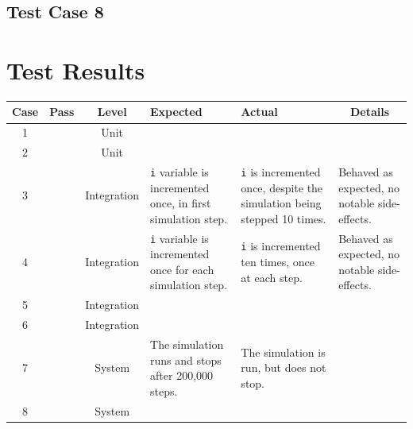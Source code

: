 \documentclass[11pt]{article}
\newcommand{\cmark}{\ding{51}}%
\newcommand{\xmark}{\ding{55}}
\begin{document}
\subsection{Test Case 8}

\newpage
\section{Test Results}%

\begin{adjustbox}{center}
\begin{tabular}{|c|c|c|p{10em}|p{10em}|p{10em}|}
	\hline
	\textbf{Case} & \textbf{Pass} & \textbf{Level} & \textbf{Expected} & \textbf{Actual} & \multicolumn{1}{c|}{\textbf{Details}} \\
	\hline
	1 & \textcolor{pass_grn}{\cmark} & Unit &&& \\
	\hline
	2 & \textcolor{pass_grn}{\cmark} & Unit &&& \\
	\hline
	3 & \textcolor{pass_grn}{\cmark} & Integration & \texttt{i} variable is incremented once, in first simulation step. & \texttt{i} is incremented once, despite the simulation being stepped 10 times. & Behaved as expected, no notable side-effects. \\
	\hline
	4 & \textcolor{pass_grn}{\cmark} & Integration & \texttt{i} variable is incremented once for each simulation step. & \texttt{i} is incremented ten times, once at each step. & Behaved as expected, no notable side-effects. \\
	\hline
	5 & \textcolor{pass_grn}{\cmark} & Integration &  & & \\
	\hline
	6 & \textcolor{pass_grn}{\cmark} & Integration &&& \\
	\hline
	7 & \textcolor{fail_red}{\xmark} & System & The simulation runs and stops after 200,000 steps. & The simulation is run, but does not stop. & \\
	\hline
	8 & \textcolor{pass_grn}{\cmark} & System &&& \\
	\hline
\end{tabular}
\end{adjustbox}
\end{document}
